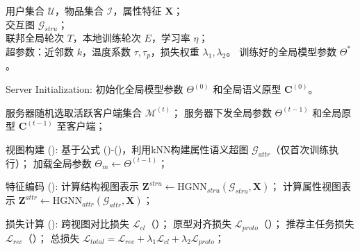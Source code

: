 \begin{algorithm}[H]  %
    \caption{FedASCL 联邦训练算法过程}
    \label{alg:fedasclrc}
    \begingroup
    \small
    \setlength{\baselineskip}{0.78\baselineskip}  %
    \setlength{\lineskip}{0.5pt}
    \begin{algorithmic}[1] %
        \Require 用户集合 $\mathcal{U}$，物品集合 $\mathcal{I}$，属性特征 $\mathbf{X}$；\\
                交互图 $\mathcal{G}_{stru}$；\\
                联邦全局轮次 $T$，本地训练轮次 $E$，学习率 $\eta$；\\
            超参数：近邻数 $k$，温度系数 $\tau, \tau_p$，损失权重 $\lambda_1, \lambda_2$。
        \Ensure 训练好的全局模型参数 $\Theta^*$。

        \State Server Initialization: 初始化全局模型参数 $\Theta^{(0)}$ 和全局语义原型 $\mathbf{C}^{(0)}$。


            \State 服务器随机选取活跃客户端集合 $\mathcal{M}^{(t)}$；
            \State 服务器下发全局参数 $\Theta^{(t-1)}$ 和全局原型 $\mathbf{C}^{(t-1)}$ 至客户端；
            
     
              
                    \State 视图构建 (): 基于公式 ()-()，利用kNN构建属性语义超图 $\mathcal{G}_{attr}$（仅首次训练执行）；
                \EndIf
                \State 加载全局参数 $\Theta_m \leftarrow \Theta^{(t-1)}$；
                
                    \State 特征编码 (): 
                    \State \qquad 计算结构视图表示 $\mathbf{Z}^{stru} \leftarrow \text{HGNN}_{stru}(\mathcal{G}_{stru}, \mathbf{X})$；
                    \State \qquad 计算属性视图表示 $\mathbf{Z}^{attr} \leftarrow \text{HGNN}_{attr}(\mathcal{G}_{attr}, \mathbf{X})$；
                    
                    \State 损失计算 ():
                    \State \qquad 跨视图对比损失 $\mathcal{L}_{cl}$（）；
                    \State \qquad 原型对齐损失 $\mathcal{L}_{proto}$（）；
                    \State \qquad 推荐主任务损失 $\mathcal{L}_{rec}$（）；
                    \State \qquad 总损失 $\mathcal{L}_{total} = \mathcal{L}_{rec} + \lambda_1 \mathcal{L}_{cl} + \lambda_2 \mathcal{L}_{proto}$；
                    

\end{algorithmic}
\end{algorithm}

